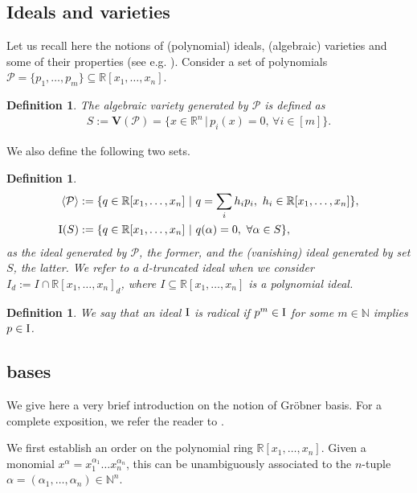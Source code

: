 \documentclass[11pt]{article}
\newcommand{\Variety}[1]{{\textbf{V}}\left( #1 \right)}
\newcommand{\I}{\emph{$\rm{I}$}}
\newcommand{\1}{\textbf{1}}
\newcommand{\GB}{\text{Gr\"{o}bner} }
\newtheorem{definition}[theorem]{Definition}
\begin{document}
\subsection*{Ideals and varieties}
Let us recall here the notions of (polynomial) ideals, (algebraic) varieties and some of their properties (see e.g. \cite{Cox}).
%
Consider a set of polynomials $\mathcal{P} = \{p_1,\ldots,p_m\} \subseteq \mathbb{R}[x_1, \dots, x_n]$. 
\begin{definition}
    The \textit{algebraic variety generated by $\mathcal{P}$} is defined as
    \begin{align*}
        S:= \Variety{\mathcal{P}} = \{x \in \mathbb{R}^n \, | \, p_i(x) = 0, \, \forall i \in [m] \}.
    \end{align*}
\end{definition}
%
We also define the following two sets.
%
\begin{definition}
        \begin{align*}
        \langle \mathcal{P} \rangle &:= \{q \in \mathbb{R}[x_1, \dots, x_n] \ | \ q = \sum_i h_i p_i, \ h_i \in \mathbb{R}[x_1, \dots, x_n]\}, \\
        \I(S) &:= \{ q \in \mathbb{R}[x_1, \dots, x_n] \ | \ q(\alpha) = 0, \ \forall \alpha \in S\},
    \end{align*}
    as the \emph{ideal generated by $\mathcal{P}$}, the former, and the \emph{(vanishing) ideal generated by set $S$}, the latter. We refer to a \emph{$d$-truncated ideal} when we consider $I_d := I \cap \mathbb{R}[x_1, \dots, x_n]_d$, where $I \subseteq \mathbb{R}[x_1, \dots, x_n]$ is a polynomial ideal.
\end{definition}

\begin{definition}\label{def:radical}
    We say that an ideal $\I$ is \emph{radical} if $p^m \in \I$ for some $m \in \mathbb{N}$ implies $p \in \I$.
\end{definition}

\subsection*{\GB bases}

We give here a very brief introduction on the notion of $\GB$ basis. For a complete exposition, we refer the reader to \cite{Cox}.

We first establish an order on the polynomial ring $\mathbb{R}[x_1, \ldots, x_n]$. Given a monomial $x^{\alpha} = x_1^{\alpha_1} \dots x_n^{\alpha_n}$, this can be unambiguously associated to the $n$-tuple $\alpha = (\alpha_1, \ldots, \alpha_n) \in \mathbb{N}^n$.
\end{document}
